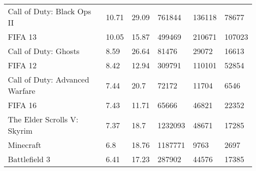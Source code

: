 \begin{table*}[!ht]
\begin{tabular}{llllll}
		\multicolumn{1}{l|}{Call of Duty: Black Ops II}      & 10.71           & 29.09          & 761844                & 136118                                                                           & 78677                                                                           \\
		\multicolumn{1}{l|}{FIFA 13}                         & 10.05           & 15.87          & 499469                & 210671                                                                           & 107023                                                                          \\
		\multicolumn{1}{l|}{Call of Duty: Ghosts}            & 8.59            & 26.64          & 81476                 & 29072                                                                            & 16613                                                                           \\
		\multicolumn{1}{l|}{FIFA 12}                         & 8.42            & 12.94          & 309791                & 110101                                                                           & 52854                                                                           \\
		\multicolumn{1}{l|}{Call of Duty: Advanced Warfare}  & 7.44            & 20.7           & 72172                 & 11704                                                                            & 6546                                                                            \\
		\multicolumn{1}{l|}{FIFA 16}                         & 7.43            & 11.71          & 65666                 & 46821                                                                            & 22352                                                                           \\
		\multicolumn{1}{l|}{The Elder Scrolls V: Skyrim}     & 7.37            & 18.7           & 1232093               & 48671                                                                            & 17285                                                                           \\
		\multicolumn{1}{l|}{Minecraft}                       & 6.8             & 18.76          & 1187771               & 9763                                                                             & 2697                                                                            \\
		\multicolumn{1}{l|}{Battlefield 3}                   & 6.41            & 17.23          & 287902                & 44576                                                                            & 17385                                                                           \\

\end{tabular}
\end{table*}
